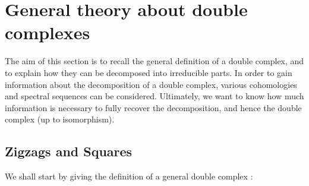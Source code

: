 \documentclass[leqno]{article}
\theoremstyle{definition}
\numberwithin{equation}{section}
\begin{document}


\section{General theory about double complexes}
\label{deux}
The aim of this section is to recall the general definition of a double complex, and to explain how they can be decomposed into irreducible parts. In order to gain information about the decomposition of a double complex, various cohomologies and spectral sequences can be considered.
Ultimately, we want to know how much information is necessary to fully recover the decomposition, and hence the double complex (up to isomorphism).
\subsection{Zigzags and Squares}
We shall start by giving the definition of a general double complex :
\end{document}
